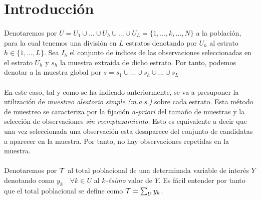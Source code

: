 \documentclass{article}
\begin{document}
  \maketitle



  \section{Introducción}

    \paragraph{}
    Denotaremos por $U = U_1 \cup ... \cup U_h \cup... \cup U_L = \{1, ...,k,...,N\} $ a la población, para la cual tenemos una división en $L$ estratos denotando por $U_h$ al estrato $h \in \{1,..., L\}$. Sea $I_h$ el conjunto de índices de las observaciones seleccionadas en el estrato $U_h$ y $s_h$ la muestra extraida de dicho estrato. Por tanto, podemos denotar a la muestra global por $s = s_1 \cup ... \cup s_h \cup ... \cup s_L$

    \paragraph{}
    En este caso, tal y como se ha indicado anteriormente, se va a presuponer la utilización de \emph{muestreo aleatorio simple (m.a.s.)} sobre cada estrato. Esta método de muestreo se caracteriza por la fijación  \emph{a-priori} del tamaño de muestras y la selección de observaciones \emph{sin reemplazamiento}. Esto es equivalente a decir que una vez seleccionada una observación esta desaparece del conjunto de candidatas a aparecer en la muestra. Por tanto, no hay observaciones repetidas en la muestra.

    \paragraph{}
    Denotaremos por $\mathcal{T}$ al total poblacional de una determinada variable de interés $Y$ denotando como $y_k \quad \forall k \in U$ al \emph{$k$-ésimo} valor de $Y$. Es fácil entender por tanto que el total poblacional se define como $\mathcal{T} = \sum_U y_k$.
\end{document}

